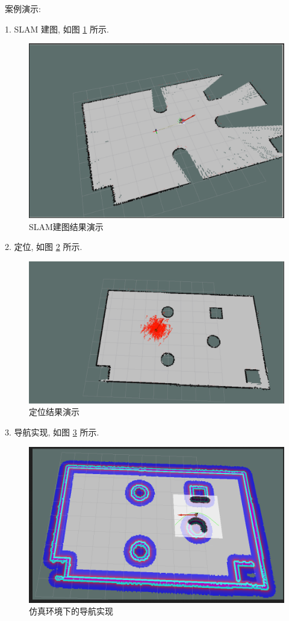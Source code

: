 \documentclass[openany, fontset=windowsold]{ctexbook}
\theoremstyle{kaiti}
\theoremstyle{normal}
\begin{document}
案例演示:

1. SLAM 建图, 如图 \ref{fig:ros_demo_nav_slam} 所示.

\begin{figure}[!ht]
  \centering
  \includegraphics[width=.7\textwidth]{ros_demo_nav_slam.png}
  \caption{SLAM建图结果演示}
  \label{fig:ros_demo_nav_slam}
\end{figure}

2. 定位, 如图 \ref{fig:ros_demo_nav_localization} 所示.

\begin{figure}[!ht]
  \centering
  \includegraphics[width=.7\textwidth]{ros_demo_nav_localization.png}
  \caption{定位结果演示}
  \label{fig:ros_demo_nav_localization}
\end{figure}

3. 导航实现, 如图 \ref{fig:ros_nav_demo} 所示.

\begin{figure}[!ht]
  \centering
  \includegraphics[width=.7\textwidth]{navigation_demo.png}
  \caption{仿真环境下的导航实现}
  \label{fig:ros_nav_demo}
\end{figure}
\end{document}
